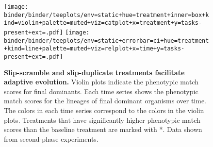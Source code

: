 \begin{figure}[!h]
  \texttt{[image: binder/binder/teeplots/env=static+hue=treatment+inner=box+kind=violin+palette=muted+viz=catplot+x=treatment+y=tasks-present+ext=.pdf]}%
   \texttt{[image: binder/binder/teeplots/env=static+errorbar=ci+hue=treatment+kind=line+palette=muted+viz=relplot+x=time+y=tasks-present+ext=.pdf]}

   \vspace{-2ex}

  \caption{\textbf{Slip-scramble and slip-duplicate treatments facilitate adaptive evolution.}
  \small Violin plots indicate the phenotypic match scores for final dominants.
  Each time series shows the phenotypic match scores for the lineages of final dominant organisms over time. The colors in each time series correspond to the colors in the violin plots.
  Treatments that have significantly higher phenotypic match scores than the baseline treatment are marked with *.
  Data shown from second-phase experiments.
}
  \label{fig:results_panels}
\end{figure}
